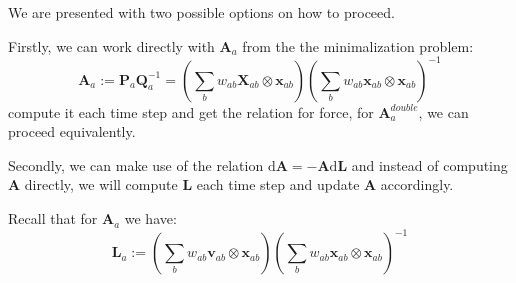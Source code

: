 \documentclass[oneside, a4paper, onecolumn, 11pt]{article}
\renewcommand{\AA}{\mathbf{A}}
\newcommand{\PP}{\mathbf{P}}
\newcommand{\vv}{\mathbf{v}}
\newcommand{\xx}{\mathbf{x}}
\newcommand{\XX}{\mathbf{X}}
\newcommand{\diff}{\mathrm{d}}
\newcommand{\QQ}{\mathbf{Q}}
\newcommand{\LL}{\mathbf{L}}
\newcommand{\Ad}{\mathbf{A}^{double}}
\begin{document}
\begin{section}
\begin{subsection}
\begin{subsection}
    We are presented with two possible options on how to proceed.
   
    Firstly, we can work directly with $\AA_a$ from the 
    the minimalization problem:
    \[
        \AA_{a} := \PP_a \QQ^{-1}_a = 
        \left( \sum_{b} w_{ab} \XX_{ab} \otimes \xx_{ab} \right) 
        \left( \sum_{b} w_{ab} \xx_{ab} \otimes \xx_{ab} \right)^{-1}
    \]
    compute it each time step and get the relation for force,
    for $\Ad_a$, we can proceed equivalently.

    Secondly, we can make use of the relation $\diff \AA = 
    - \AA \diff \LL$ and instead of computing $\AA$ directly, we
    will compute $\LL$ each time step and update $\AA$ accordingly.

    Recall that for $\AA_a$ we have:
    \[
        \LL_a := \left( \sum_b w_{ab} \vv_{ab} \otimes \xx_{ab}\right)
        \left( \sum_b w_{ab} \xx_{ab} \otimes \xx_{ab}\right)^{-1}
    \]


\end{subsection}
\end{subsection}
\end{section}
\end{document}
